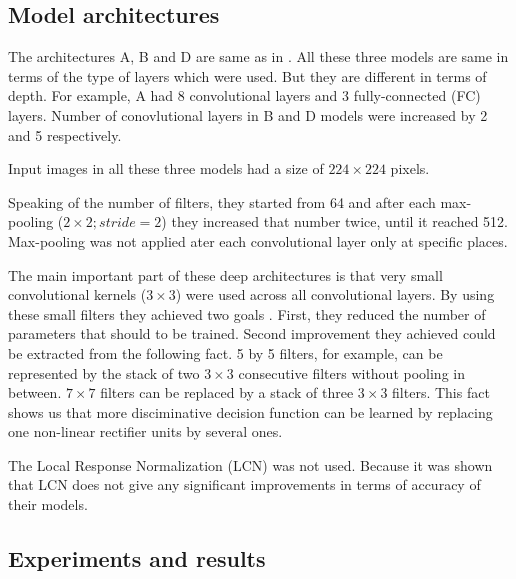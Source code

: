 \documentclass[paper=a4, fontsize=11pt]{scrartcl} %
\numberwithin{equation}{section} %
\numberwithin{figure}{section} %
\numberwithin{table}{section} %
\begin{document}
\subsection{Model architectures}

The architectures A, B and D are same as in \cite{simonyan2014very}. All these three models are same in terms of the type of layers which were used. But they are different in terms of depth. For example, A had 8 convolutional layers and 3 fully-connected (FC) layers. Number of conovlutional layers in B and D models were increased by 2 and 5 respectively. \par 
Input images in all these three models had a size of $224\times224$ pixels. \par
Speaking of the number of filters, they started from 64 and after each max-pooling ($2\times2; stride = 2$) they increased that number twice, until it reached 512. Max-pooling was not applied ater each convolutional layer only at specific places. \par
The main important part of these deep architectures is that very small convolutional kernels ($3\times3$) were used across all convolutional layers. By using these small filters they achieved two goals \cite{simonyan2014very}. First, they reduced the number of parameters that should to be trained. Second improvement they achieved could be extracted from the following fact. 5 by 5 filters, for example, can be represented by the stack of two $3\times3$ consecutive filters without pooling in between. $7\times7$ filters can be replaced by a stack of three $3\times3$ filters. This fact shows us that more disciminative decision function can be learned by replacing one non-linear rectifier units by several ones. \par
The Local Response Normalization (LCN) \cite{krizhevsky2012imagenet} was not used. Because it was shown that LCN does not give any significant improvements in terms of accuracy of their models.

\subsection{Experiments and results}
\end{document}
